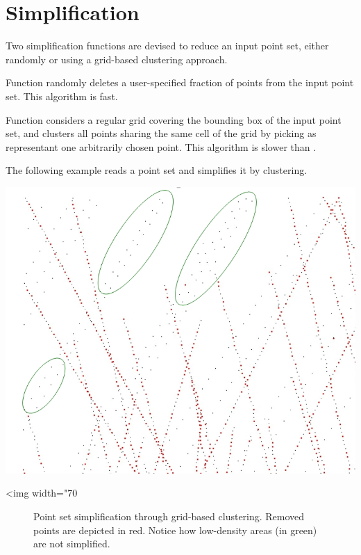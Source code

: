 \section{Simplification}

Two simplification functions are devised to reduce an input point set, either randomly or using a grid-based clustering approach.

Function  randomly deletes a user-specified fraction of points from the input point set. This algorithm is fast.

Function  considers a regular grid covering the bounding box of the input point set, and clusters all points sharing the same cell of the grid by picking as representant one arbitrarily chosen point. This algorithm is slower than .

\ccExample

The following example reads a point set and simplifies it by clustering.

\begin{center}
    \begin{ccTexOnly}
        \includegraphics[width=1.0\textwidth]{Point_set_processing_3/grid_simplification} %
    \end{ccTexOnly}
    \begin{ccHtmlOnly}
        <img width="70%
    \end{ccHtmlOnly}
    \begin{figure}[h]
        \caption{Point set simplification through grid-based clustering.
                 Removed points are depicted in red. Notice how
                 low-density areas (in green) are not simplified.}
        \label{Point_set_processing_3-fig-grid_simplification}
    \end{figure}
\end{center}



